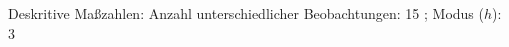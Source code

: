 				\label{tableValues:bocc242i_v1}
				\vspace*{-\baselineskip}
                    \begin{noten}
                	    \note{} Deskritive Maßzahlen:
                	    Anzahl unterschiedlicher Beobachtungen: 15%
                	    ; 
                	      Modus ($h$): 3
                     \end{noten}


